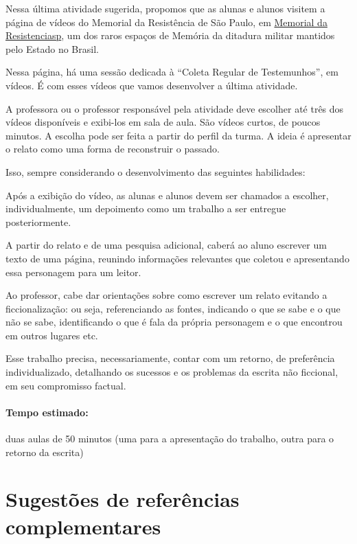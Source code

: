 \documentclass[12pt]{extarticle}
\begin{document}
Nessa última atividade sugerida, propomos que as alunas e alunos visitem
a página de vídeos do Memorial da Resistência de São Paulo, em
\href{http://memorialdaresistenciasp.org.br/acervo/}{Memorial da Resistenciasp}, um dos raros espaços de
Memória da ditadura militar mantidos pelo Estado no Brasil.



Nessa página, há uma sessão dedicada à ``Coleta Regular de
Testemunhos'', em vídeos. É com esses vídeos que vamos desenvolver a
última atividade.

A professora ou o professor responsável pela atividade deve escolher até
três dos vídeos disponíveis e exibi-los em sala de aula. São vídeos
curtos, de poucos minutos. A escolha pode ser feita a partir do perfil
da turma. A ideia é apresentar o relato como uma forma de
reconstruir o passado.

Isso, sempre considerando o desenvolvimento das seguintes habilidades:


Após a exibição do vídeo, as alunas e alunos devem ser chamados a
escolher, individualmente, um depoimento como um trabalho a ser entregue
posteriormente.

A partir do relato e de uma pesquisa adicional, caberá ao aluno escrever
um texto de uma página, reunindo informações relevantes que coletou e
apresentando essa personagem para um leitor.

Ao professor, cabe dar orientações sobre como escrever um relato
evitando a ficcionalização: ou seja, referenciando as fontes, indicando
o que se sabe e o que não se sabe, identificando o que é fala da própria
personagem e o que encontrou em outros lugares etc.

Esse trabalho precisa, necessariamente, contar com um retorno, de
preferência individualizado, detalhando os sucessos e os problemas da
escrita não ficcional, em seu compromisso factual.

\paragraph{Tempo estimado:} duas aulas de 50 minutos (uma para a
apresentação do trabalho, outra para o retorno da escrita)


\section{Sugestões de referências complementares}
\end{document}
